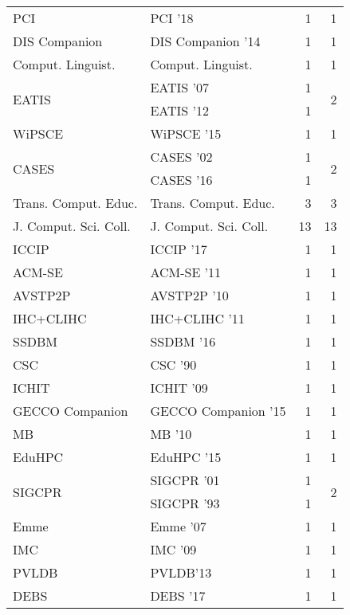 \begin{table*}[t]
\begin{tabular}{llrr}
\multirow{1}{*}{PCI } & PCI '18 & 1 & \multirow{1}{*}{1}\\
\multirow{1}{*}{DIS Companion } & DIS Companion '14 & 1 & \multirow{1}{*}{1}\\
\multirow{1}{*}{Comput. Linguist.} & Comput. Linguist. & 1 & \multirow{1}{*}{1}\\
\multirow{2}{*}{EATIS } & EATIS '07 & 1 & \multirow{2}{*}{2}\\
& EATIS '12 & 1 &\\
\multirow{1}{*}{WiPSCE } & WiPSCE '15 & 1 & \multirow{1}{*}{1}\\
\multirow{2}{*}{CASES } & CASES '02 & 1 & \multirow{2}{*}{2}\\
& CASES '16 & 1 &\\
\multirow{1}{*}{Trans. Comput. Educ.} & Trans. Comput. Educ. & 3 & \multirow{1}{*}{3}\\
\multirow{1}{*}{J. Comput. Sci. Coll.} & J. Comput. Sci. Coll. & 13 & \multirow{1}{*}{13}\\
\multirow{1}{*}{ICCIP } & ICCIP '17 & 1 & \multirow{1}{*}{1}\\
\multirow{1}{*}{ACM-SE } & ACM-SE '11 & 1 & \multirow{1}{*}{1}\\
\multirow{1}{*}{AVSTP2P } & AVSTP2P '10 & 1 & \multirow{1}{*}{1}\\
\multirow{1}{*}{IHC+CLIHC } & IHC+CLIHC '11 & 1 & \multirow{1}{*}{1}\\
\multirow{1}{*}{SSDBM } & SSDBM '16 & 1 & \multirow{1}{*}{1}\\
\multirow{1}{*}{CSC } & CSC '90 & 1 & \multirow{1}{*}{1}\\
\multirow{1}{*}{ICHIT } & ICHIT '09 & 1 & \multirow{1}{*}{1}\\
\multirow{1}{*}{GECCO Companion } & GECCO Companion '15 & 1 & \multirow{1}{*}{1}\\
\multirow{1}{*}{MB } & MB '10 & 1 & \multirow{1}{*}{1}\\
\multirow{1}{*}{EduHPC } & EduHPC '15 & 1 & \multirow{1}{*}{1}\\
\multirow{2}{*}{SIGCPR } & SIGCPR '01 & 1 & \multirow{2}{*}{2}\\
& SIGCPR '93 & 1 &\\
\multirow{1}{*}{Emme } & Emme '07 & 1 & \multirow{1}{*}{1}\\
\multirow{1}{*}{IMC } & IMC '09 & 1 & \multirow{1}{*}{1}\\
\multirow{1}{*}{PVLDB} & PVLDB'13 & 1 & \multirow{1}{*}{1}\\
\multirow{1}{*}{DEBS } & DEBS '17 & 1 & \multirow{1}{*}{1}\\

\end{tabular}
\end{table*}

